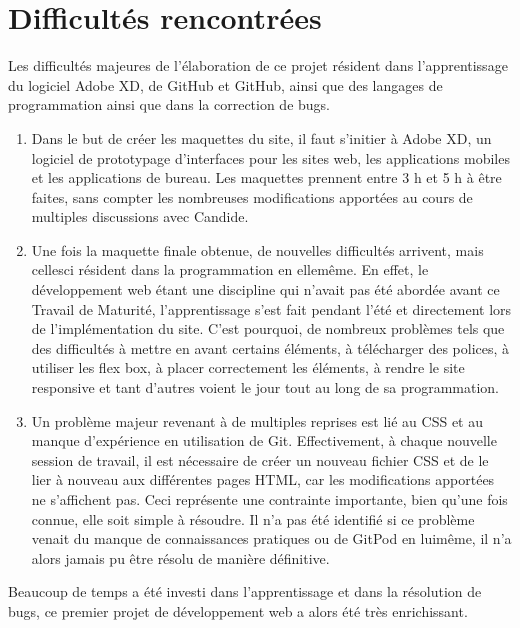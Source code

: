 \documentclass[a4,10pt,french]{sphinxmanual}
\begin{document}
\section{Difficultés rencontrées}
\label{\detokenize{chapitre-03:difficultes-rencontrees}}
\sphinxAtStartPar
Les difficultés majeures de l’élaboration de ce projet résident dans l’apprentissage du logiciel Adobe XD, de GitHub et GitHub, ainsi que des langages de programmation ainsi que dans la correction de bugs.
\begin{enumerate}
%
\item {} 
\sphinxAtStartPar
Dans le but de créer les maquettes du site, il faut s’initier à Adobe XD, un logiciel de prototypage d’interfaces pour les sites web, les applications mobiles et les applications de bureau. Les maquettes prennent entre 3 h et 5 h à être faites, sans compter les nombreuses modifications apportées au cours de multiples discussions avec Candide.

\item {} 
\sphinxAtStartPar
Une fois la maquette finale obtenue, de nouvelles difficultés arrivent, mais celles\sphinxhyphen{}ci résident dans la programmation en elle\sphinxhyphen{}même. En effet, le développement web étant une discipline qui n’avait pas été abordée avant ce Travail de Maturité, l’apprentissage s’est fait pendant l’été et directement lors de l’implémentation du site. C’est pourquoi, de nombreux problèmes tels que des difficultés à mettre en avant certains éléments, à télécharger des polices, à utiliser les flex box, à placer correctement les éléments, à rendre le site responsive et tant d’autres voient le jour tout au long de sa programmation.

\item {} 
\sphinxAtStartPar
Un problème majeur revenant à de multiples reprises est lié au CSS et au manque d’expérience en utilisation de Git. Effectivement, à chaque nouvelle session de travail, il est nécessaire de créer un nouveau fichier CSS et de le lier à nouveau aux différentes pages HTML, car les modifications apportées ne s’affichent pas. Ceci représente une contrainte importante, bien qu’une fois connue, elle soit simple à résoudre.
Il n’a pas été identifié si ce problème venait du manque de connaissances pratiques ou de GitPod en lui\sphinxhyphen{}même, il n’a alors jamais pu être résolu de manière définitive.

\end{enumerate}

\sphinxAtStartPar
Beaucoup de temps a été investi dans l’apprentissage et dans la résolution de bugs, ce premier projet de développement web a alors été très enrichissant.
\end{document}
